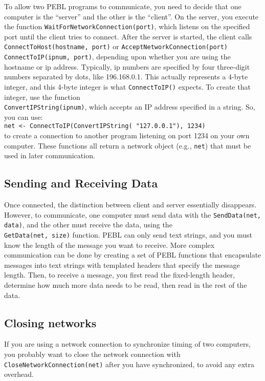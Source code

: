 To allow two PEBL programs to communicate, you need to decide that one
computer is the ``server'' and the other is the ``client''.  On the
server, you execute the function
\texttt{WaitForNetworkConnection(port)}, which listens on the
specified port until the client tries to connect.  After the server is
started, the client calls \texttt{ConnectToHost(hostname, port)} or
\texttt{AcceptNetworkConnection(port)}
\texttt{ConnectToIP(ipnum, port)}, depending upon whether you are using the
hostname or ip address.  Typically, ip numbers are specified by four
three-digit numbers separated by dots, like 196.168.0.1. This actually
represents a 4-byte integer, and this 4-byte integer is what
\texttt{ConnectToIP()} expects.  To create that integer, use the
function \\ \texttt{ConvertIPString(ipnum)}, which accepts an IP address
specified in a string.  So, you can use:\\
\texttt{net <- ConnectToIP(ConvertIPString( "127.0.0.1"), 1234)}\\
to create a
connection to another program listening on port 1234 on your own
computer.  These functions all return a network object (e.g.,
\texttt{net}) that must be
used in later communication.

\subsection{Sending and Receiving Data}
Once connected, the distinction between client and server essentially
disappears.  However, to communicate, one computer must send data with
the \texttt{SendData(net, data)}, and the other must receive the
data, using the \\\texttt{GetData(net, size)} function.  PEBL can
only send text strings, and you must know the length of the message
you want to receive.  More complex communication can be done by
creating a set of PEBL functions that encapsulate messages into text
strings with templated headers that specify the message length.  Then,
to receive a message, you first read the fixed-length header,
determine how much more data needs to be read, then read in the rest
of the data. 


\subsection{Closing networks}
If you are using a network connection to synchronize timing of two
computers, you probably want to close the network connection with\\
\texttt{CloseNetworkConnection(net)} after you have synchronized, to
avoid any extra overhead.

